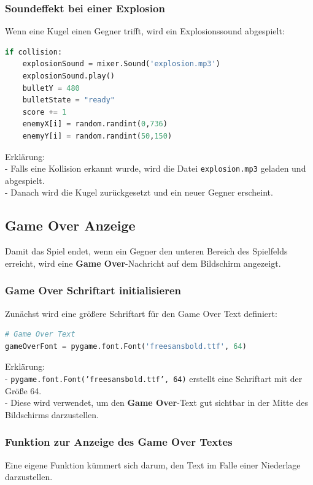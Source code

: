 \documentclass{article}
\begin{document}
\subsubsection{Soundeffekt bei einer Explosion}
Wenn eine Kugel einen Gegner trifft, wird ein Explosionssound abgespielt:

\begin{lstlisting}[style=pythonstyle, language=Python]
if collision:
    explosionSound = mixer.Sound('explosion.mp3')
    explosionSound.play()
    bulletY = 480
    bulletState = "ready"
    score += 1
    enemyX[i] = random.randint(0,736)
    enemyY[i] = random.randint(50,150)
\end{lstlisting}

Erklärung:\\
- Falls eine Kollision erkannt wurde, wird die Datei \texttt{explosion.mp3} geladen und abgespielt.\\
- Danach wird die Kugel zurückgesetzt und ein neuer Gegner erscheint.

\subsection{Game Over Anzeige}
Damit das Spiel endet, wenn ein Gegner den unteren Bereich des Spielfelds erreicht, wird eine \textbf{Game Over}-Nachricht auf dem Bildschirm angezeigt.

\subsubsection{Game Over Schriftart initialisieren}
Zunächst wird eine größere Schriftart für den Game Over Text definiert:

\begin{lstlisting}[style=pythonstyle, language=Python]
# Game Over Text
gameOverFont = pygame.font.Font('freesansbold.ttf', 64)
\end{lstlisting}

Erklärung:\\
- \texttt{pygame.font.Font('freesansbold.ttf', 64)} erstellt eine Schriftart mit der Größe 64.\\
- Diese wird verwendet, um den \textbf{Game Over}-Text gut sichtbar in der Mitte des Bildschirms darzustellen.

\subsubsection{Funktion zur Anzeige des Game Over Textes}
Eine eigene Funktion kümmert sich darum, den Text im Falle einer Niederlage darzustellen.
\end{document}
